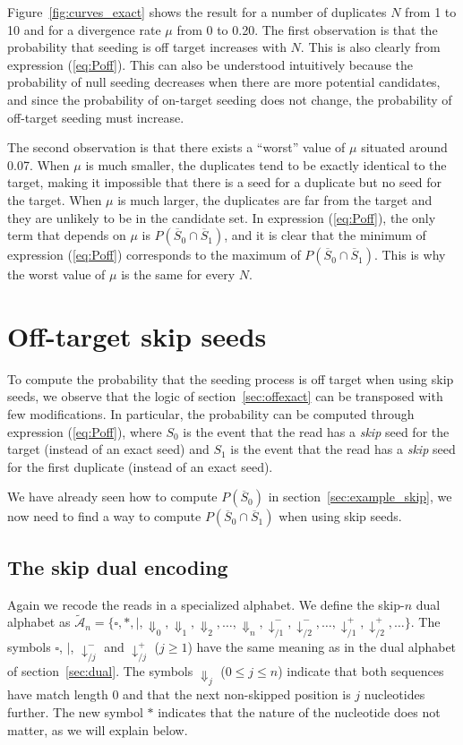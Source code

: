 \documentclass{article}
\begin{document}
Figure~\ref{fig:curves_exact} shows the result for a number of duplicates
$N$ from 1 to 10 and for a divergence rate $\mu$ from 0 to 0.20. The first
observation is that the probability that seeding is off target increases
with $N$. This is also clearly from expression (\ref{eq:Poff}). This can
also be understood intuitively because the probability of null seeding
decreases when there are more potential candidates, and since the
probability of on-target seeding does not change, the probability of
off-target seeding must increase.

The second observation is that there exists a ``worst'' value of $\mu$
situated around 0.07. When $\mu$ is much smaller, the duplicates tend to
be exactly identical to the target, making it impossible that there is a
seed for a duplicate but no seed for the target. When $\mu$ is much
larger, the duplicates are far from the target and they are unlikely to be
in the candidate set. In expression (\ref{eq:Poff}), the only term that
depends on $\mu$ is $P(\overline{S}_0 \cap \overline{S}_1)$, and it is
clear that the minimum of expression (\ref{eq:Poff}) corresponds to the
maximum of $P(\overline{S}_0 \cap \overline{S}_1)$. This is why the worst
value of $\mu$ is the same for every $N$.


\section{Off-target skip seeds}
\label{sec_offskip}

To compute the probability that the seeding process is off target when
using skip seeds, we observe that the logic of section~\ref{sec:offexact}
can be transposed with few modifications. In particular, the probability
can be computed through expression (\ref{eq:Poff}), where $S_0$ is the
event that the read has a \emph{skip} seed for the target (instead of an
exact seed) and $S_1$ is the event that the read has a \emph{skip} seed
for the first duplicate (instead of an exact seed).

We have already seen how to compute $P(\overline{S}_0)$ in
section~\ref{sec:example_skip}, we now need to find a way to compute
$P(\overline{S}_0 \cap \overline{S}_1)$ when using skip seeds.

\subsection{The skip dual encoding}

Again we recode the reads in a specialized alphabet. We define the
skip-$n$ dual alphabet as $\tilde{\mathcal{A}}_n = \{\square, *, |,
\Downarrow_0, \Downarrow_1, \Downarrow_2, \ldots, \Downarrow_n,
\downarrow^-_{/1}, \downarrow^-_{/2}, \ldots, \downarrow^+_{/1},
\downarrow^+_{/2}, \ldots\}$. The symbols $\square$, $|$,
$\downarrow^-_{/j}$ and $\downarrow^+_{/j}$ ($j \geq 1$) have the same
meaning as in the dual alphabet of section~\ref{sec:dual}. The symbols
$\Downarrow_j$ ($0 \leq j \leq n$) indicate that both sequences have match
length 0 and that the next non-skipped position is $j$ nucleotides
further. The new symbol $*$ indicates that the nature of the nucleotide
does not matter, as we will explain below.
 
\end{document}
